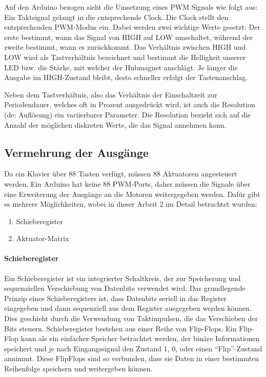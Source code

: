 \begin{enumerate}
Auf den Arduino bezogen sieht die Umsetzung eines \ac{PWM} Signals wie folgt aus:
Ein Taktsignal gelangt in die entsprechende Clock.
Die Clock stellt den entsprechenden \ac{PWM}-Modus ein.
Dabei werden zwei wichtige Werte gesetzt:
Der erste bestimmt, wann das Signal von HIGH auf LOW umschaltet, während der zweite bestimmt, wann es zurückkommt.
Das Verhältnis zwischen HIGH und LOW wird als Tastverhältnis bezeichnet und bestimmt die Helligkeit unserer LED bzw. die Stärke, mit welcher der Hubmagnet anschlägt.
Je länger die Ausgabe im HIGH-Zustand bleibt, desto schneller erfolgt der Tastenanschlag.

Neben dem Tastverhältnis, also das Verhältnis der Einschaltzeit zur Periodendauer, welches oft in Prozent ausgedrückt wird, ist auch die Resolution (de: Auflösung) ein variierbarer Parameter.
Die Resolution bezieht sich auf die Anzahl der möglichen diskreten Werte, die das Signal annehmen kann.


\subsection{Vermehrung der Ausgänge}\label{output}
Da ein Klavier über 88 Tasten verfügt, müssen 88 Aktuatoren angesteuert werden. Ein Arduino hat keine 88 \ac{PWM}-Ports, daher
müssen die Signale über eine Erweiterung der Ausgänge an die Motoren weitergegeben werden. Dafür gibt es mehrere Möglichkeiten,
wobei in dieser Arbeit 2 im Detail betrachtet wurden:

\begin{enumerate}
	\item Schieberegister
	\item Aktuator-Matrix
\end{enumerate}


\paragraph{Schieberegister}
Ein Schieberegister ist ein integrierter Schaltkreis, der zur Speicherung und sequenziellen Verschiebung von
Datenbits verwendet wird.\newline
Das grundlegende Prinzip eines Schieberegisters ist, dass Datenbits seriell in das Register eingegeben und dann
sequenziell aus dem Register ausgegeben werden können.
Dies geschieht durch die Verwendung von Taktimpulsen, die das Verschieben der Bits steuern.\newline
Schieberegister bestehen aus einer Reihe von Flip-Flops.
Ein Flip-Flop kann als ein einfacher Speicher betrachtet werden, der binäre Informationen speichert und je nach
Eingangssignal den Zustand 1, 0, oder einen \enquote{Flip}-Zustand annimmt.
Diese FlipFlops sind so verbunden, dass sie Daten in einer bestimmten Reihenfolge speichern und weitergeben können.


\end{enumerate}
